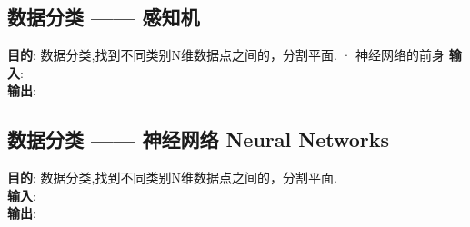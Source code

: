 \documentclass{article}
\begin{document}
\subsection{数据分类 —— 感知机}
\textbf{目的}: 数据分类,找到不同类别N维数据点之间的，分割平面.
· 神经网络的前身
\textbf{输入}: \\
\textbf{输出}: \\


\subsection{数据分类 —— 神经网络 Neural Networks}
\textbf{目的}: 数据分类,找到不同类别N维数据点之间的，分割平面.\\
\textbf{输入}: \\
\textbf{输出}: \\
\end{document}
